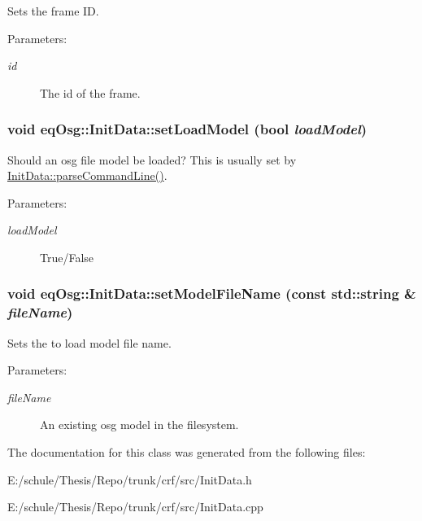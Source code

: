 Sets the frame ID. 

\begin{Desc}
\item[Parameters:]
\begin{description}
\item[{\em id}]The id of the frame. \end{description}
\end{Desc}
\hypertarget{a00011_de8e662e01371948b9717ffe8412ed45}{
\subsubsection[{setLoadModel}]{\setlength{\rightskip}{0pt plus 5cm}void eqOsg::InitData::setLoadModel (bool {\em loadModel})}}
\label{a00011_de8e662e01371948b9717ffe8412ed45}


Should an osg file model be loaded? This is usually set by \hyperlink{a00011_911e15d0bc1d4e427ad574a9b9e0fff9}{InitData::parseCommandLine()}. 

\begin{Desc}
\item[Parameters:]
\begin{description}
\item[{\em loadModel}]True/False \end{description}
\end{Desc}
\hypertarget{a00011_71d9d6c19244b8bf10e8fae264a2327c}{
\subsubsection[{setModelFileName}]{\setlength{\rightskip}{0pt plus 5cm}void eqOsg::InitData::setModelFileName (const std::string \& {\em fileName})}}
\label{a00011_71d9d6c19244b8bf10e8fae264a2327c}


Sets the to load model file name. 

\begin{Desc}
\item[Parameters:]
\begin{description}
\item[{\em fileName}]An existing osg model in the filesystem. \end{description}
\end{Desc}


The documentation for this class was generated from the following files:\begin{CompactItemize}
\item 
E:/schule/Thesis/Repo/trunk/crf/src/InitData.h\item 
E:/schule/Thesis/Repo/trunk/crf/src/InitData.cpp\end{CompactItemize}
